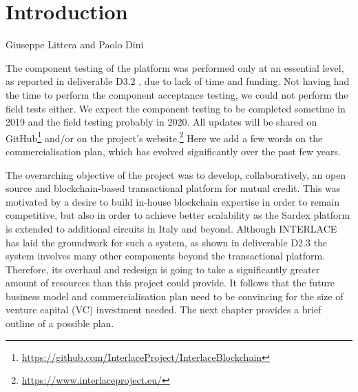 \chapter{Introduction}
\label{ch:Introduction}

\vspace{-1cm}
\begin{center}
Giuseppe Littera and Paolo Dini
\end{center}

The component testing of the platform was performed only at an essential level, as reported in deliverable D3.2 \cite{INTERLACE_D32}, due to lack of time and funding. Not having had the time to perform the component acceptance testing, we could not perform the field tests either. We expect the component testing to be completed sometime in 2019 and the field testing probably in 2020. All updates will be shared on GitHub\footnote{\url{https://github.com/InterlaceProject/InterlaceBlockchain}} and/or on the project's website.\footnote{\url{https://www.interlaceproject.eu/}} Here we add a few words on the commercialisation plan, which has evolved significantly over the past few years.

The overarching objective of the project was to develop, collaboratively, an open source and blockchain-based transactional platform for mutual credit. This was motivated by a desire to build in-house blockchain expertise in order to remain competitive, but also in order to achieve better scalability as the Sardex platform is extended to additional circuits in Italy and beyond. Although INTERLACE has laid the groundwork for such a system, as shown in deliverable D2.3 \cite{INTERLACE_D23} the system involves many other components beyond the transactional platform. Therefore, its overhaul and redesign is going to take a significantly greater amount of resources than this project could provide. It follows that the future business model and commercialisation plan need to be convincing for the size of venture capital (VC) investment needed. The next chapter provides a brief outline of a possible plan.

\newpage
